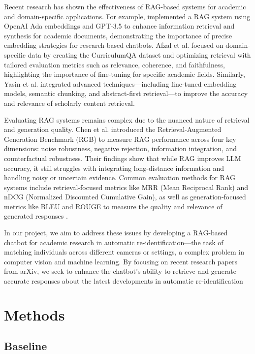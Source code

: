 \documentclass[fleqn,moreauthors,10pt]{ds_report}
\begin{document}
Recent research has shown the effectiveness of RAG-based systems for academic and domain-specific applications. For example, \cite{Chatbots_in_Academia} implemented a RAG system using OpenAI Ada embeddings and GPT-3.5 to enhance information retrieval and synthesis for academic documents, demonstrating the importance of precise embedding strategies for research-based chatbots. Afzal et al. \cite{afzal2024towards} focused on domain-specific data by creating the CurriculumQA dataset and optimizing retrieval with tailored evaluation metrics such as relevance, coherence, and faithfulness, highlighting the importance of fine-tuning for specific academic fields. Similarly, Yasin et al. \cite{yasin2024retrieval} integrated advanced techniques—including fine-tuned embedding models, semantic chunking, and abstract-first retrieval—to improve the accuracy and relevance of scholarly content retrieval.

Evaluating RAG systems remains complex due to the nuanced nature of retrieval and generation quality. Chen et al. \cite{chen2024benchmarking} introduced the Retrieval-Augmented Generation Benchmark (RGB) to measure RAG performance across four key dimensions: noise robustness, negative rejection, information integration, and counterfactual robustness. Their findings show that while RAG improves LLM accuracy, it still struggles with integrating long-distance information and handling noisy or uncertain evidence. Common evaluation methods for RAG systems include retrieval-focused metrics like MRR (Mean Reciprocal Rank) and nDCG (Normalized Discounted Cumulative Gain), as well as generation-focused metrics like BLEU and ROUGE to measure the quality and relevance of generated responses \cite{lewis2020rag}.

In our project, we aim to address these issues by developing a RAG-based chatbot for academic research in automatic re-identification—the task of matching individuals across different cameras or settings, a complex problem in computer vision and machine learning. By focusing on recent research papers from arXiv, we seek to enhance the chatbot’s ability to retrieve and generate accurate responses about the latest developments in automatic re-identification


\section*{Methods}
\subsection*{Baseline}
\end{document}

